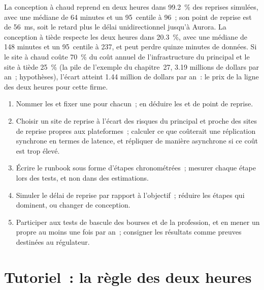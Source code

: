 La conception à chaud reprend en deux heures dans 99.2~\% des reprises simulées, avec une médiane de 64 minutes et un 95~centile à 96~; son
point de reprise est de \qty{56}{\milli\second}, soit le retard plus le délai unidirectionnel jusqu'à Aurora. La conception à tiède respecte les deux heures dans 20.3~\%, avec une
médiane de 148 minutes et un 95~centile à 237, et peut perdre quinze minutes de données. Si le site à chaud coûte 70~\% du
coût annuel de l'infrastructure du principal et le site à tiède 25~\% (la pile de l'exemple du chapitre~27, 3.19 millions de dollars par an~; hypothèses), l'écart atteint
1.44 million de dollars par an~: le prix de la ligne des deux heures pour cette firme.

\begin{method}\label{met:nw:disaster-recovery-and-regulatory-requirements:design}
\begin{enumerate}
\item Nommer les  et fixer une  pour chacun~; en déduire les  et de point de reprise.
\item Choisir un site de reprise à l'écart des risques du principal et proche des sites de reprise propres aux plateformes~; calculer ce que coûterait
  une réplication synchrone en termes de latence, et répliquer de manière asynchrone si ce coût est trop élevé.
\item Écrire le runbook sous forme d'étapes chronométrées~; mesurer chaque étape lors des tests, et non dans des estimations.
\item Simuler le délai de reprise par rapport à l'objectif~; réduire les étapes qui dominent, ou changer de conception.
\item Participer aux tests de bascule des bourses et de la profession, et en mener un propre au moins une fois par an~; consigner les résultats
  comme preuves destinées au régulateur.
\end{enumerate}
\end{method}

\section{Tutoriel~: la règle des deux heures}\label{tut:nw:disaster-recovery-and-regulatory-requirements:tut}

